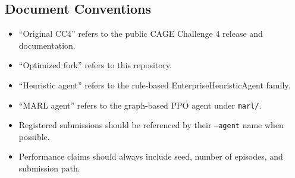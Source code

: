 \subsection{Document Conventions}

\begin{itemize}
  \item ``Original CC4'' refers to the public CAGE Challenge 4 release and documentation.
  \item ``Optimized fork'' refers to this repository.
  \item ``Heuristic agent'' refers to the rule-based EnterpriseHeuristicAgent family.
  \item ``MARL agent'' refers to the graph-based PPO agent under \texttt{marl/}.
  \item Registered submissions should be referenced by their \texttt{--agent} name when possible.
  \item Performance claims should always include seed, number of episodes, and submission path.
\end{itemize}

